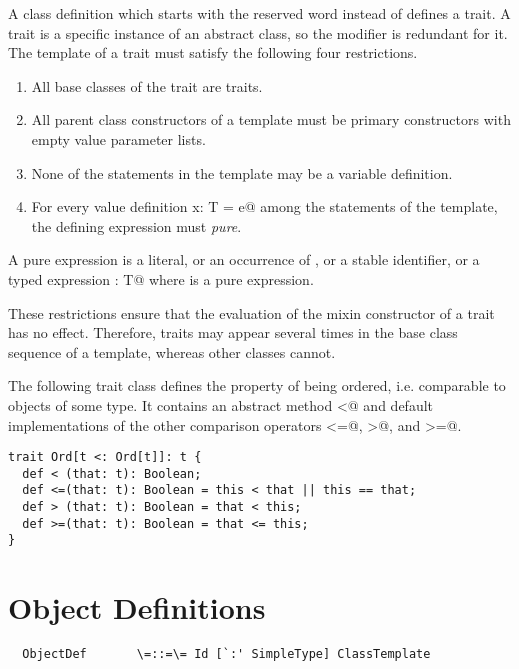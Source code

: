 \documentclass[11pt]{report}
\begin{document}
A class definition which starts with the reserved word \verb@trait@
instead of \verb@class@ defines a trait. A trait is a specific
instance of an abstract class, so the \verb@abstract@ modifier is
redundant for it.  The template of a trait must satisfy the following
four restrictions.
\begin{enumerate}
\item All base classes of the trait are traits.
\item All parent class constructors of a template
      must be primary constructors with empty value
      parameter lists. 
\item None of the statements in the template may be a variable definition.
\item For every value definition \verb@val x: T = e@ among the statements 
      of the template, the defining expression \verb@e@ must {\em pure}.      
\end{enumerate}
A pure expression is a literal, or an occurrence of \verb@this@,
or a stable identifier, or a typed expression \verb@e: T@ where
\verb@e@ is a pure expression.

These restrictions ensure that the evaluation of the mixin constructor
of a trait has no effect. Therefore, traits may appear several times 
in the base class sequence of a template, whereas other classes cannot.

\example\label{ex:comparable}
The following trait class defines the property of being
ordered, i.e. comparable to objects of some type. It contains an abstract method
\verb@<@ and default implementations of the other comparison operators
\verb@<=@, \verb@>@, and \verb@>=@.

\begin{verbatim}
trait Ord[t <: Ord[t]]: t {
  def < (that: t): Boolean;
  def <=(that: t): Boolean = this < that || this == that;
  def > (that: t): Boolean = that < this;
  def >=(that: t): Boolean = that <= this;
}
\end{verbatim}

\section{Object Definitions}
\label{sec:modules}
\label{sec:object-defs}

\syntax\begin{verbatim}
  ObjectDef       \=::=\= Id [`:' SimpleType] ClassTemplate
\end{verbatim}
\end{document}
